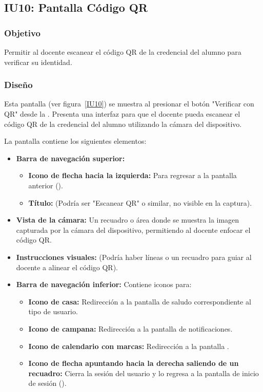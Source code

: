 \subsection{IU10: Pantalla Código QR}

\newpage

\subsubsection{Objetivo}
Permitir al docente escanear el código QR de la credencial del alumno para verificar su identidad.

\subsubsection{Diseño}
Esta pantalla  (ver figura~\ref{IU10}) se muestra al presionar el botón "Verificar con QR" desde la . Presenta una interfaz para que el docente pueda escanear el código QR de la credencial del alumno utilizando la cámara del dispositivo.



La pantalla contiene los siguientes elementos:
\begin{itemize}
	\item \textbf{Barra de navegación superior:}
	\begin{itemize}
		\item \textbf{Icono de flecha hacia la izquierda:} Para regresar a la pantalla anterior ().
		\item \textbf{Título:} (Podría ser "Escanear QR" o similar, no visible en la captura).
	\end{itemize}
	\item \textbf{Vista de la cámara:} Un recuadro o área donde se muestra la imagen capturada por la cámara del dispositivo, permitiendo al docente enfocar el código QR.
	\item \textbf{Instrucciones visuales:} (Podría haber líneas o un recuadro para guiar al docente a alinear el código QR).
	\item \textbf{Barra de navegación inferior:} Contiene iconos para:
	\begin{itemize}
		\item \textbf{Icono de casa:} Redirección a la pantalla de saludo correspondiente al tipo de usuario.
		\item \textbf{Icono de campana:} Redirección a la pantalla de notificaciones.
		\item \textbf{Icono de calendario con marcas:} Redirección a la pantalla .
		\item \textbf{Icono de flecha apuntando hacia la derecha saliendo de un recuadro:} Cierra la sesión del usuario y lo regresa a la pantalla de inicio de sesión ().
	\end{itemize}
\end{itemize}

